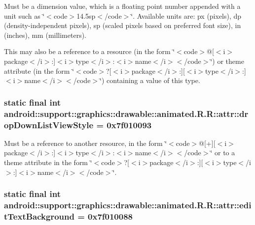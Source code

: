Must be a dimension value, which is a floating point number appended with a unit such as \char`\"{}$<$code$>$14.5sp$<$/code$>$\char`\"{}. Available units are: px (pixels), dp (density-independent pixels), sp (scaled pixels based on preferred font size), in (inches), mm (millimeters). 

This may also be a reference to a resource (in the form \char`\"{}$<$code$>$@\mbox{[}$<$i$>$package$<$/i$>$:\mbox{]}$<$i$>$type$<$/i$>$:$<$i$>$name$<$/i$>$$<$/code$>$\char`\"{}) or theme attribute (in the form \char`\"{}$<$code$>$?\mbox{[}$<$i$>$package$<$/i$>$:\mbox{]}\mbox{[}$<$i$>$type$<$/i$>$:\mbox{]}$<$i$>$name$<$/i$>$$<$/code$>$\char`\"{}) containing a value of this type. \hypertarget{classandroid_1_1support_1_1graphics_1_1drawable_1_1animated_1_1_r_1_1attr_b0607ae3c1e1126ad32ad720cd40ed6f}{
\subsubsection[{dropDownListViewStyle}]{\setlength{\rightskip}{0pt plus 5cm}static final int android::support::graphics::drawable::animated.R.R::attr::dropDownListViewStyle = 0x7f010093}}
\label{classandroid_1_1support_1_1graphics_1_1drawable_1_1animated_1_1_r_1_1attr_b0607ae3c1e1126ad32ad720cd40ed6f}


Must be a reference to another resource, in the form \char`\"{}$<$code$>$@\mbox{[}+\mbox{]}\mbox{[}$<$i$>$package$<$/i$>$:\mbox{]}$<$i$>$type$<$/i$>$:$<$i$>$name$<$/i$>$$<$/code$>$\char`\"{} or to a theme attribute in the form \char`\"{}$<$code$>$?\mbox{[}$<$i$>$package$<$/i$>$:\mbox{]}\mbox{[}$<$i$>$type$<$/i$>$:\mbox{]}$<$i$>$name$<$/i$>$$<$/code$>$\char`\"{}. \hypertarget{classandroid_1_1support_1_1graphics_1_1drawable_1_1animated_1_1_r_1_1attr_df955b0e7bd15afe7a805c49c05b4a50}{
\subsubsection[{editTextBackground}]{\setlength{\rightskip}{0pt plus 5cm}static final int android::support::graphics::drawable::animated.R.R::attr::editTextBackground = 0x7f010088}}
\label{classandroid_1_1support_1_1graphics_1_1drawable_1_1animated_1_1_r_1_1attr_df955b0e7bd15afe7a805c49c05b4a50}



